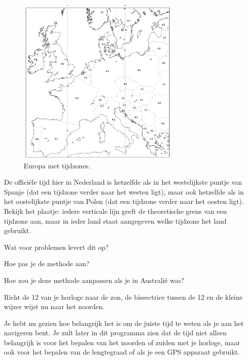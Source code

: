 \begin{figure}[!b]
    \centering
    \includegraphics[width=0.7\textwidth]{europe_timezone_plus.png}
    \caption{Europa met tijdzones.}
\end{figure}

\begin{opgave}
    De offici\"ele tijd hier in Nederland is hetzelfde als in het westelijkste puntje van Spanje (dat een tijdzone verder naar het westen ligt), maar ook hetzelfde als in het oostelijkste puntje van Polen (dat een tijdzone verder naar het oosten ligt). Bekijk het plaatje: iedere verticale lijn geeft de theoretische grens van een tijdzone aan, maar in ieder land staat aangegeven welke tijdzone het land gebruikt. 
    \begin{subopgave}
        Wat voor problemen levert dit op?
    \end{subopgave}
    \begin{subopgave}[\ster]
        Hoe pas je de methode aan?
    \end{subopgave}
\end{opgave}

\begin{opgave}
    Hoe zou je deze methode aanpassen als je in Australi\"{e} was?
    \begin{antwoord}
        Richt de 12 van je horloge naar de zon, de bissectrice tussen de 12 en de kleine wijzer wijst nu naar het noorden.
    \end{antwoord}
\end{opgave}

Je hebt nu gezien hoe belangrijk het is om de juiste tijd te weten als je aan het navigeren bent. Je zult later in dit programma zien dat de tijd niet alleen belangrijk is voor het bepalen van het noorden of zuiden met je horloge, maar ook voor het bepalen van de lengtegraad of als je een GPS apparaat gebruikt.
